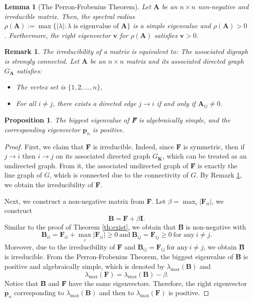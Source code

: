 \documentclass{article}
\newtheorem{lemma}{Lemma}[section]
\newtheorem{proposition}{Proposition}[section]
\newtheorem{remark}{Remark}
\begin{document}
\begin{lemma}[The Perron-Frobenius Theorem]

Let \(\bm A\) be an \(n \times n\) non-negative and irreducible matrix. Then, the spectral radius \(\rho(\bm A):= \max \{ |\lambda| : \lambda \text{ is eigenvalue of } \bm A \}\) is a simple eigenvalue and \(\rho(\bm A) > 0\). Furthermore, the right eigenvector \(\mathbf{v}\) for \(\rho(\bm A)\) satisfies \(\mathbf{v} > 0\).

\end{lemma}
\begin{remark}\label{irreducible}
The irreducibility of a matrix is equivalent to: The associated digraph is strongly connected. Let \( \bm A \) be an \( n \times n \) matrix and  its associated directed graph \( G_{\bm A} \) satisfies:

\begin{itemize}
    \item The vertex set is \( \{1, 2, \ldots, n\} \),
    \item For all \( i \neq j \), there exists a directed edge \( j \to i \) if and only if  
    \(\bm A_{ij} \neq 0.\)
\end{itemize}
\end{remark}
\begin{proposition}\label{irreducibleF}
The biggest eigenvalue of  \textbf{\~{F}} is algebraically simple, and the corresponding eigenvector $\bm p_n$ is positive.
\end{proposition}
\begin{proof}
First, we claim that \textbf{\~{F}} is irreducible. Indeed, 
since \textbf{\~{F}} is symmetric, then if \( j \to i \) then \( i \to j \) on its associated directed graph \( G_{\textbf{\~{K}}} \), which can be treated as an undirected graph. From it, the associated undirected graph of \textbf{\~{F}} is exactly the line graph of $G$, which is connected due to the connectivity of $G$. By Remark \ref{irreducible}, we obtain the irreducibility of \textbf{\~{F}}.

Next, we construct a non-negative matrix from \textbf{\~{F}}. Let   \(\beta =\max_i |\bm F_{ii}|\), we construct 
\[ \textbf{\~{B}} = \textbf{\~{F}} + \beta \bm I.\]
Similar to the proof of Theorem \ref{th:exist}, we obtain that \textbf{\~{B}} is non-negative with
\[\textbf{\~{B}}_{ii}=\bm F_{ii}+\max_i |\bm F_{ii}|\geq 0 ~\mbox{and}~ \textbf{\~{B}}_{ij}=\textbf{\~{F}}_{ij}\geq0 ~\mbox{for any}~i\neq j.\]
Moreover, due to the irreducibility of \textbf{\~{F}} and $\textbf{\~{B}}_{ij}=\textbf{\~{F}}_{ij} ~\mbox{for any}~i\neq j$, we obtain \textbf{\~{B}} is irreducible. From the Perron-Frobenius Theorem, the biggest eigenvalue of \textbf{\~{B}} is positive and algebraically simple, which is denoted by $\lambda_{\max}(\textbf{\~{B}})$ and 
\[\lambda_{\max}(\textbf{\~{F}})=\lambda_{\max}(\textbf{\~{B}})-\beta.\]
Notice that \textbf{\~{B}} and \textbf{\~{F}} have the same eigenvectors. Therefore,
the right eigenvector \(\mathbf{p}_n\) corresponding to  $\lambda_{\max}(\textbf{\~{B}})$ and then to $\lambda_{\max}(\textbf{\~{F}})$  is positive.
\end{proof}
\end{document}
